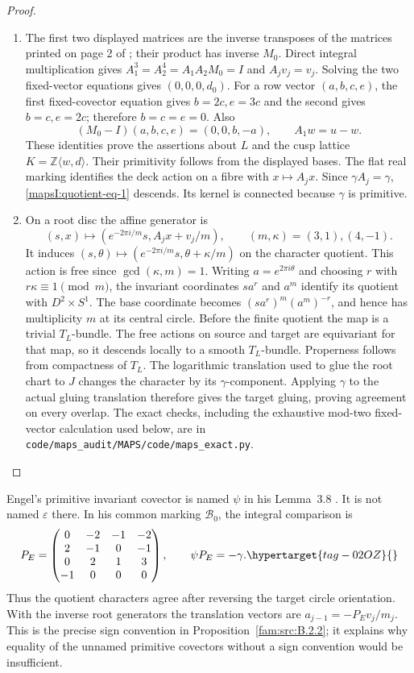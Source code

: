 \begin{proof}
\begin{enumerate}[label=\arabic*.,leftmargin=*]
\item The first two displayed matrices are the inverse transposes of
the matrices printed on page 2 of \cite{AC2026}; their product
has inverse $M_0$.  Direct integral multiplication gives
$A_1^3=A_2^4=A_1A_2M_0=I$ and $A_jv_j=v_j$.
Solving the two fixed-vector equations gives $(0,0,0,d_0)$.
For a row vector $(a,b,c,e)$, the first fixed-covector equation
gives $b=2c,e=3c$ and the second gives $b=c,e=2c$;
therefore $b=c=e=0$.  Also
\[
 (M_0-I)(a,b,c,e)=(0,0,b,-a),\qquad
 A_1w=u-w.
\]
These identities prove the assertions about $L$ and the cusp
lattice $K=\mathbb Z\langle w,d\rangle$.  Their primitivity follows
from the displayed bases.  The flat real marking identifies the
deck action on a fibre with $x\mapsto A_jx$.  Since
$\gamma A_j=\gamma$, \eqref{mapsI:quotient-eq-1} descends.  Its kernel is connected
because $\gamma$ is primitive.

\item On a root disc the affine generator is
\[
 (s,x)\longmapsto
 (e^{-2\pi i/m}s,A_jx+v_j/m),\qquad (m,\kappa)=(3,1),(4,-1).
\]
It induces $(s,\theta)\mapsto
(e^{-2\pi i/m}s,\theta+\kappa/m)$ on the character quotient.
This action is free since $\gcd(\kappa,m)=1$.  Writing
$a=e^{2\pi i\theta}$ and choosing $r$ with $r\kappa\equiv1\pmod m$,
the invariant coordinates $s a^r$ and $a^m$ identify its quotient
with $D^2\times S^1$.  The base coordinate becomes
$(s a^r)^m(a^m)^{-r}$, and hence has multiplicity $m$ at its
central circle.  Before the finite quotient the map is a trivial
$T_L$-bundle.  The free actions on source and target are
equivariant for that map, so it descends locally to a smooth
$T_L$-bundle.  Properness follows from compactness of $T_L$.
The logarithmic translation used to glue the root chart to $J$
changes the character by its $\gamma$-component.  Applying
$\gamma$ to the actual gluing translation therefore gives the
target gluing, proving agreement on every overlap.
The exact checks, including the exhaustive mod-two fixed-vector
calculation used below, are in \texttt{code/maps\_audit/MAPS/code/maps\_exact.py}.
\end{enumerate}
\end{proof}


Engel's primitive invariant covector is named $\psi$ in his
Lemma~3.8 \cite[Lemma~3.8]{Engel2026}.  It is not named $\varepsilon$ there.  In his
common marking $\mathcal B_0$, the integral comparison is
\[
 P_E=\begin{pmatrix}0&-2&-1&-2\\2&-1&0&-1\\0&2&1&3\\-1&0&0&0\end{pmatrix},
 \qquad \psi P_E=-\gamma.
 \hypertarget{tag-02OZ}{}\label{mapsI:quotient-eq-2}
\]
Thus the quotient characters agree after reversing the target
circle orientation.  With the inverse root generators the
translation vectors are $a_{j-1}=-P_Ev_j/m_j$.
This is the precise sign convention in Proposition~\ref{fam:src:B.2.2}; it explains why equality of the unnamed primitive
covectors without a sign convention would be insufficient.

